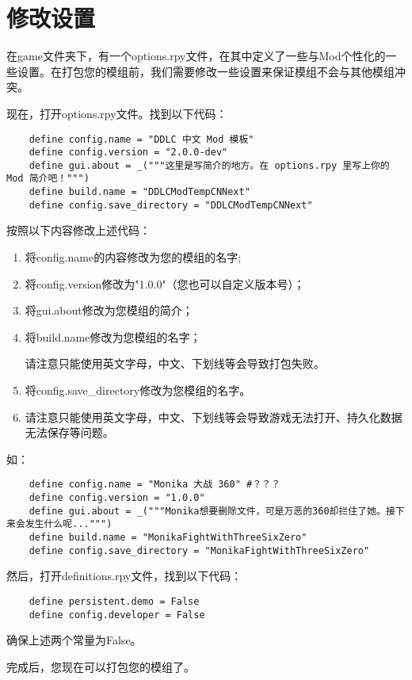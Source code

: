 \section{修改设置}

在game文件夹下，有一个options.rpy文件，在其中定义了一些与Mod个性化的一些设置。在打包您的模组前，我们需要修改一些设置来保证模组不会与其他模组冲突。

现在，打开options.rpy文件。找到以下代码：
\begin{lstlisting}
    define config.name = "DDLC 中文 Mod 模板"
    define config.version = "2.0.0-dev"
    define gui.about = _("""这里是写简介的地方。在 options.rpy 里写上你的 Mod 简介吧！""")
    define build.name = "DDLCModTempCNNext"
    define config.save_directory = "DDLCModTempCNNext"
\end{lstlisting}

按照以下内容修改上述代码：
\begin{enumerate}
    \item 将config.name的内容修改为您的模组的名字;
    \item 将config.version修改为"1.0.0"（您也可以自定义版本号）；
    \item 将gui.about修改为您模组的简介；
    \item 将build.name修改为您模组的名字；
    \begin{Attention}
        请注意只能使用英文字母，中文、下划线等会导致打包失败。
    \end{Attention}
    \item 将config.save\_directory修改为您模组的名字。
    \item \begin{Attention}
        请注意只能使用英文字母，中文、下划线等会导致游戏无法打开、持久化数据无法保存等问题。
    \end{Attention}
\end{enumerate}
如：
\begin{lstlisting}
    define config.name = "Monika 大战 360" #？？？
    define config.version = "1.0.0"
    define gui.about = _("""Monika想要删除文件，可是万恶的360却拦住了她。接下来会发生什么呢...""")
    define build.name = "MonikaFightWithThreeSixZero"
    define config.save_directory = "MonikaFightWithThreeSixZero"
\end{lstlisting}

然后，打开definitions.rpy文件，找到以下代码：
\begin{lstlisting}
    define persistent.demo = False
    define config.developer = False
\end{lstlisting}

确保上述两个常量为False。

完成后，您现在可以打包您的模组了。